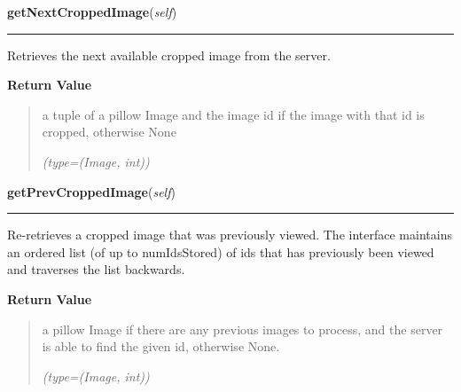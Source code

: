 \hspace{.8\funcindent}\begin{boxedminipage}{\funcwidth}

    \raggedright \textbf{getNextCroppedImage}(\textit{self})

    \vspace{-1.5ex}

    \rule{\textwidth}{0.5\fboxrule}
\setlength{\parskip}{2ex}
    Retrieves the next available cropped image from the server.

\setlength{\parskip}{1ex}
      \textbf{Return Value}
    \vspace{-1ex}

      \begin{quote}
      a tuple of a pillow Image and the image id if the image with that id 
      is cropped, otherwise None

      {\it (type=(Image, int))}

      \end{quote}

    \end{boxedminipage}

    \label{client_rest:ImagingInterface:getPrevCroppedImage}

    \vspace{0.5ex}

\hspace{.8\funcindent}\begin{boxedminipage}{\funcwidth}

    \raggedright \textbf{getPrevCroppedImage}(\textit{self})

    \vspace{-1.5ex}

    \rule{\textwidth}{0.5\fboxrule}
\setlength{\parskip}{2ex}
    Re-retrieves a cropped image that was previously viewed. The interface 
    maintains an ordered list (of up to numIdsStored) of ids that has 
    previously been viewed and traverses the list backwards.

\setlength{\parskip}{1ex}
      \textbf{Return Value}
    \vspace{-1ex}

      \begin{quote}
      a pillow Image if there are any previous images to process, and the 
      server is able to find the given id, otherwise None.

      {\it (type=(Image, int))}

      \end{quote}

    \end{boxedminipage}

